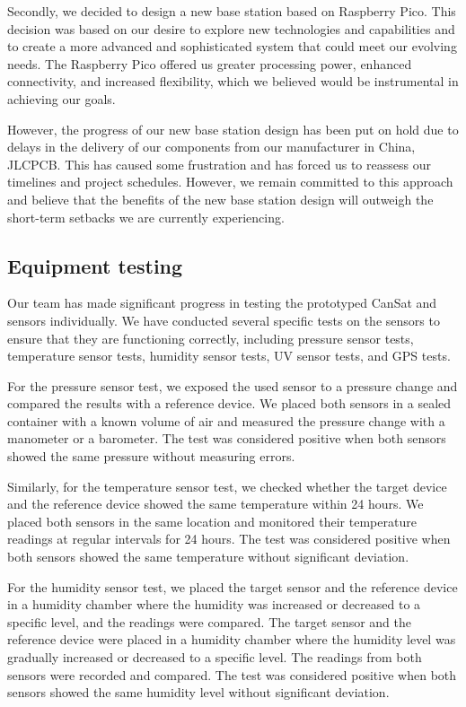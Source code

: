 \documentclass[11pt]{article}
\begin{document}
Secondly, we decided to design a new base station based on Raspberry Pico. This decision was based on our desire to explore new technologies and capabilities and to create a more advanced and sophisticated system that could meet our evolving needs. The Raspberry Pico offered us greater processing power, enhanced connectivity, and increased flexibility, which we believed would be instrumental in achieving our goals.

However, the progress of our new base station design has been put on hold due to delays in the delivery of our components from our manufacturer in China, JLCPCB. This has caused some frustration and has forced us to reassess our timelines and project schedules. However, we remain committed to this approach and believe that the benefits of the new base station design will outweigh the short-term setbacks we are currently experiencing.

\subsection*{Equipment testing}


Our team has made significant progress in testing the prototyped CanSat and sensors individually. We have conducted several specific tests on the sensors to ensure that they are functioning correctly, including pressure sensor tests, temperature sensor tests, humidity sensor tests, UV sensor tests, and GPS tests.

For the pressure sensor test, we exposed the used sensor to a pressure change and compared the results with a reference device. We placed both sensors in a sealed container with a known volume of air and measured the pressure change with a manometer or a barometer. The test was considered positive when both sensors showed the same pressure without measuring errors.

Similarly, for the temperature sensor test, we checked whether the target device and the reference device showed the same temperature within 24 hours. We placed both sensors in the same location and monitored their temperature readings at regular intervals for 24 hours. The test was considered positive when both sensors showed the same temperature without significant deviation.

For the humidity sensor test, we placed the target sensor and the reference device in a humidity chamber where the humidity was increased or decreased to a specific level, and the readings were compared. The target sensor and the reference device were placed in a humidity chamber where the humidity level was gradually increased or decreased to a specific level. The readings from both sensors were recorded and compared. The test was considered positive when both sensors showed the same humidity level without significant deviation.
\end{document}
